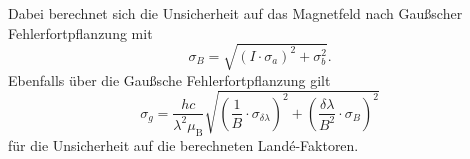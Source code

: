  Dabei berechnet sich die Unsicherheit auf das Magnetfeld nach Gaußscher Fehlerfortpflanzung mit
 \begin{equation}
     \sigma_B = \sqrt{(I\cdot \sigma_a)^2 + \sigma_b^2} .
 \end{equation}
 Ebenfalls über die Gaußsche Fehlerfortpflanzung gilt
 \begin{equation}
    \sigma_g = \frac{hc}{\lambda^2 \mu_\text{B}} \sqrt{\left(\frac{1}{B} \cdot \sigma_{\delta \lambda}\right)^2 + \left(\frac{\delta \lambda}{B^2}\cdot \sigma_B \right)^2}
 \end{equation} \noindent
 für die Unsicherheit auf die berechneten Landé-Faktoren.
